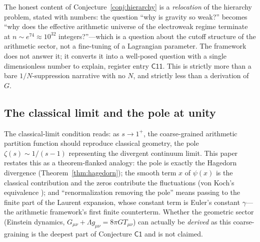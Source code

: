The honest content of Conjecture~\ref{conj:hierarchy} is a \emph{relocation} of the hierarchy
problem, stated with numbers: the question ``why is gravity so weak?'' becomes ``why does the
effective arithmetic universe of the electroweak regime terminate at $n\sim e^{74}\approx
10^{32}$ integers?''---which is a question about the cutoff structure of the arithmetic
sector, not a fine-tuning of a Lagrangian parameter. The framework does not answer it; it
converts it into a well-posed question with a single dimensionless number to explain,
register entry $\mathsf{C11}$. This is strictly more than a bare
$1/N$-suppression narrative with no $N$, and strictly less than a derivation of $G$.

\subsection{The classical limit and the pole at unity}

The classical-limit condition reads: as $s\to1^{+}$, the coarse-grained
arithmetic partition function should reproduce classical geometry, the pole
$\zeta(s)\sim1/(s-1)$ representing the divergent continuum limit. This paper
restates this as a theorem-flanked analogy: the pole is exactly the Hagedorn divergence
(Theorem~\ref{thm:hagedorn}); the smooth term $x$ of $\psi(x)$ is the classical contribution
and the zeros contribute the fluctuations (von Koch's equivalence
\cite{vonkoch1901}); and ``renormalization removing the pole'' means passing to the
finite part of the Laurent expansion, whose constant term is Euler's constant $\gamma$---the
arithmetic framework's first finite counterterm. Whether the geometric sector (Einstein
dynamics, $G_{\mu\nu}+\Lambda g_{\mu\nu}=8\pi GT_{\mu\nu}$) can actually be \emph{derived} as
this coarse-graining is the deepest part of Conjecture $\mathsf{C1}$ and is not claimed.
